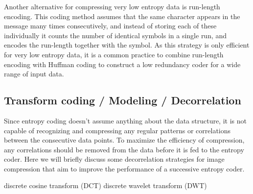       Another alternative for compressing very low entropy data is run-length encoding. This coding method assumes that the same character appears in the message many times consecutively, and instead of storing each of these individually it counts the number of identical symbols in a single run, and encodes the run-length together with the symbol. As this strategy is only efficient for very low entropy data, it is a common practice to combine run-length encoding with Huffman coding to construct a low redundancy coder for a wide range of input data.
  
    \subsection{Transform coding / Modeling / Decorrelation}
      \label{sec:decorrelation}
      Since entropy coding doesn't assume anything about the data structure, it is not capable of recognizing and compressing any regular patterns or correlations between the consecutive data points. To maximize the efficiency of compression, any correlations should be removed from the data before it is fed to the entropy coder. Here we will briefly discuss some decorrelation strategies for image compression that aim to improve the performance of a successive entropy coder.


  
      discrete cosine transform (DCT) \cite{ahmed_discrete_1974}
      discrete wavelet transform (DWT) \cite{mallat_theory_1989, jensen_ripples_2001}
      
      
  
      
